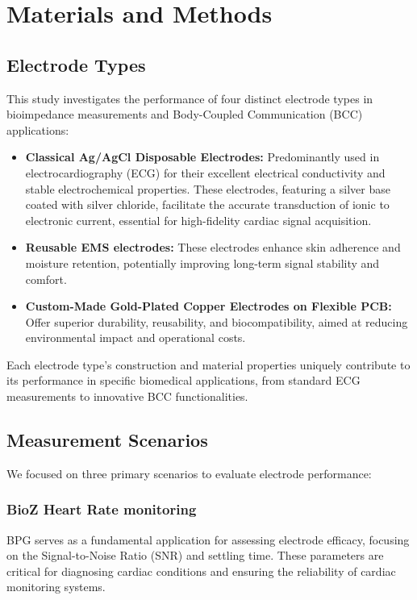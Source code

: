 \documentclass[conference]{IEEEtran}
\newcommand{\notea}[1]{\textcolor{blue}{Armands: #1}}
\begin{document}



\section{Materials and Methods}

\subsection{Electrode Types}
This study investigates the performance of four distinct electrode types in bioimpedance measurements and Body-Coupled Communication (BCC) applications:
\begin{itemize}
    \item \textbf{Classical Ag/AgCl Disposable Electrodes:} Predominantly used in electrocardiography (ECG) for their excellent electrical conductivity and stable electrochemical properties. These electrodes, featuring a silver base coated with silver chloride, facilitate the accurate transduction of ionic to electronic current, essential for high-fidelity cardiac signal acquisition.
    
    \item \textbf{Reusable EMS electrodes:} These electrodes enhance skin adherence and moisture retention, potentially improving long-term signal stability and comfort.
    
    \item \textbf{Custom-Made Gold-Plated Copper Electrodes on Flexible PCB:} Offer superior durability, reusability, and biocompatibility, aimed at reducing environmental impact and operational costs.
    
\end{itemize}

Each electrode type's construction and material properties uniquely contribute to its performance in specific biomedical applications, from standard ECG measurements to innovative BCC functionalities. 


\subsection{Measurement Scenarios}
We focused on three primary scenarios to evaluate electrode performance:

\subsubsection{BioZ Heart Rate monitoring}
BPG serves as a fundamental application for assessing electrode efficacy, focusing on the Signal-to-Noise Ratio (SNR) and settling time. These parameters are critical for diagnosing cardiac conditions and ensuring the reliability of cardiac monitoring systems.
\end{document}
